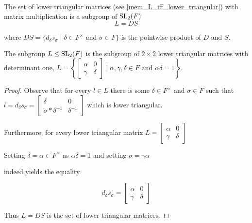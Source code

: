 \begin{definition}
\label{SpecialSubgroups.L}
\leanok
    The set of lower triangular matrices (see \ref{mem_L_iff_lower_triangular}) with matrix multiplication is a subgroup of $\operatorname{SL}_2(F)$
    \[
    L = DS
    \]

    where $DS = \{d_\delta s_\sigma \; | \; \delta \in F^\times \text{ and } \sigma \in F \}$ is the pointwise product of $D$ and $S$.
\end{definition}

\begin{remark}
    \label{mem_L_iff_lower_triangular}
    \leanok
    The subgroup $L \le \operatorname{SL}_2(F)$ is the subgroup of $2 \times 2$ lower triangular matrices with determinant one, $L =\left\{\begin{bmatrix}
    \alpha & 0\\
    \gamma & \delta
    \end{bmatrix} \; | \; \alpha, \gamma, \delta \in F \text{ and } \alpha \delta = 1 \right\}$.
\end{remark}

\begin{proof}
    Observe that for every $l \in L$ there is some $\delta \in F^\times$ and $\sigma \in F$ such that $l  = d_\delta s_\sigma = \begin{bmatrix}
        \delta & 0\\
        \sigma * \delta^{-1} & \delta^{-1}
    \end{bmatrix}$ which is lower triangular. 
    
    Furthermore, for every lower triangular matrix $L = \begin{bmatrix}
        \alpha & 0\\
        \gamma & \delta
    \end{bmatrix}$ 
    
    Setting $\delta = \alpha \in F^\times$ as $\alpha \delta = 1$ and setting $\sigma = \gamma \alpha$

    indeed yields the equality

    \[
    d_\delta s_\sigma = \begin{bmatrix}
        \alpha & 0\\
        \gamma & \delta
    \end{bmatrix}
    \]

    Thus $L = D S$ is the set of lower triangular matrices.
\end{proof}

